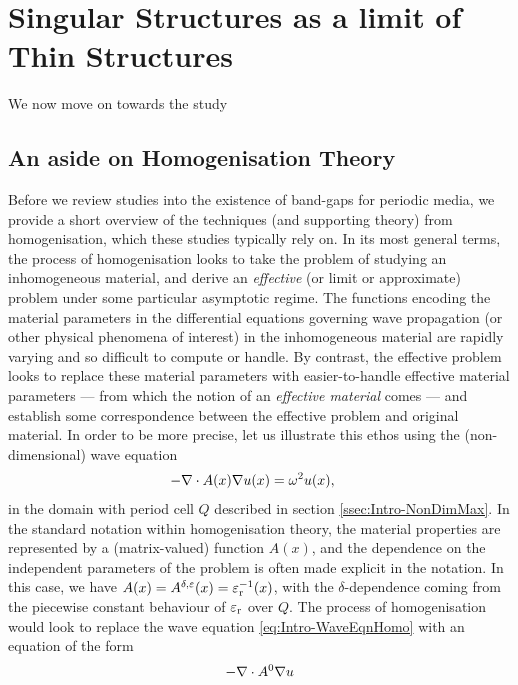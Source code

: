 \section{Singular Structures as a limit of Thin Structures} \label{sec:ConvToSS}

We now move on towards the study

\subsection{An aside on Homogenisation Theory} \label{ssec:Intro-HomoTheory}

Before we review studies into the existence of band-gaps for periodic media, we provide a short overview of the techniques (and supporting theory) from homogenisation, which these studies typically rely on.
In its most general terms, the process of homogenisation looks to take the problem of studying an inhomogeneous material, and derive an \emph{effective} (or limit or approximate) problem under some particular asymptotic regime.
The functions encoding the material parameters in the differential equations governing wave propagation (or other physical phenomena of interest) in the inhomogeneous material are rapidly varying and so difficult to compute or handle.
By contrast, the effective problem looks to replace these material parameters with easier-to-handle effective material parameters --- from which the notion of an \emph{effective material} comes --- and establish some correspondence between the effective problem and original material.
In order to be more precise, let us illustrate this ethos using the (non-dimensional) wave equation 
\begin{align} \label{eq:Intro-WaveEqnHomo}
	-\nabla\cdot A(x)\nabla u(x) &= \omega^2 u(x),
\end{align}
in the domain with period cell $Q$ described in section \ref{ssec:Intro-NonDimMax}.
In the standard notation within homogenisation theory, the material properties are represented by a (matrix-valued) function $A(x)$, and the dependence on the independent parameters of the problem is often made explicit in the notation.
In this case, we have $A(x)=A^{\delta,\varepsilon}(x)=\varepsilon_{\mathrm{r}}^{-1}(x)$, with the $\delta$-dependence coming from the piecewise constant behaviour of $\varepsilon_{\mathrm{r}}$ over $Q$.
The process of homogenisation would look to replace the wave equation \eqref{eq:Intro-WaveEqnHomo} with an equation of the form
\begin{align}
	-\nabla\cdot A^{0}\nabla u
\end{align}

